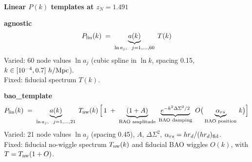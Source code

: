\documentclass[11pt]{article}
\begin{document}
{\large\bfseries Linear $P(k)$ templates at $z_N=1.491$}

\bigskip
{\color{ag}\bfseries agnostic}
\[
P_{\rm lin}(k)\;=\;\underbrace{a(k)}_{\ln a_j,\ \ j=1,\dots,60}\;T(k)
\]
Varied: 60 node values $\ln a_j$ (cubic spline in $\ln k$, spacing 0.15, $k\in[10^{-4},0.7]\ h/{\rm Mpc}$).\\
Fixed: fiducial spectrum $T(k)$.

\bigskip\bigskip
{\color{bt}\bfseries bao\_template}
\[
P_{\rm lin}(k)\;=\;\underbrace{a(k)}_{\ln a_j,\ \ j=1,\dots,21}\;T_{\rm nw}(k)\,\Big[\,1\;+\;
\underbrace{(1+A)}_{\text{BAO amplitude}}\;
\underbrace{e^{-k^2\Delta\Sigma^2/2}}_{\text{BAO damping}}\;
O\big(\underbrace{\alpha_{rs}}_{\text{BAO position}}\,k\big)\Big]
\]
Varied: 21 node values $\ln a_j$ (spacing 0.45), $A$, $\Delta\Sigma^2$, $\alpha_{rs}=h r_d/(h r_d)_{\rm fid}$.\\
Fixed: fiducial no-wiggle spectrum $T_{\rm nw}(k)$ and fiducial BAO wiggles $O(k)$, with $T=T_{\rm nw}(1+O)$.
\end{document}
